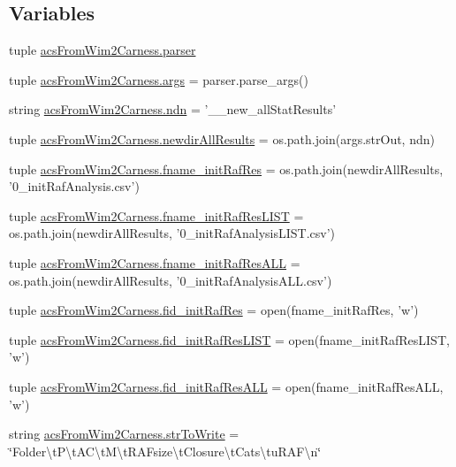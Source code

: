 \subsection*{Variables}
\begin{DoxyCompactItemize}
\item 
tuple \hyperlink{a00094_aed93287ef2c9a4a9ba68f8ffc75aae17}{acs\-From\-Wim2\-Carness.\-parser}
\item 
tuple \hyperlink{a00094_ac4c461267ee7f11bbe525de64f56cd10}{acs\-From\-Wim2\-Carness.\-args} = parser.\-parse\-\_\-args()
\item 
string \hyperlink{a00094_a6f995419ddd7f2de58506d9541238dbc}{acs\-From\-Wim2\-Carness.\-ndn} = '\-\_\-\_\-new\-\_\-all\-Stat\-Results'
\item 
tuple \hyperlink{a00094_a4af2fb5abbd4a6e8930401e66af5b79d}{acs\-From\-Wim2\-Carness.\-newdir\-All\-Results} = os.\-path.\-join(args.\-str\-Out, ndn)
\item 
tuple \hyperlink{a00094_a6df9226d812c675c76a936c215c07e53}{acs\-From\-Wim2\-Carness.\-fname\-\_\-init\-Raf\-Res} = os.\-path.\-join(newdir\-All\-Results, '0\-\_\-init\-Raf\-Analysis.\-csv')
\item 
tuple \hyperlink{a00094_a69f06c42408f8a1ae74e34daa83402b7}{acs\-From\-Wim2\-Carness.\-fname\-\_\-init\-Raf\-Res\-L\-I\-S\-T} = os.\-path.\-join(newdir\-All\-Results, '0\-\_\-init\-Raf\-Analysis\-L\-I\-S\-T.\-csv')
\item 
tuple \hyperlink{a00094_a89c98e628d7938077b4ed18215d4fd9b}{acs\-From\-Wim2\-Carness.\-fname\-\_\-init\-Raf\-Res\-A\-L\-L} = os.\-path.\-join(newdir\-All\-Results, '0\-\_\-init\-Raf\-Analysis\-A\-L\-L.\-csv')
\item 
tuple \hyperlink{a00094_a2f9cfe05abfed3ab6326d0cb094c7c80}{acs\-From\-Wim2\-Carness.\-fid\-\_\-init\-Raf\-Res} = open(fname\-\_\-init\-Raf\-Res, 'w')
\item 
tuple \hyperlink{a00094_a7af2668de12720f3c7925527002d81b0}{acs\-From\-Wim2\-Carness.\-fid\-\_\-init\-Raf\-Res\-L\-I\-S\-T} = open(fname\-\_\-init\-Raf\-Res\-L\-I\-S\-T, 'w')
\item 
tuple \hyperlink{a00094_add1c3bb75f1d98889c27099fc14fc6a8}{acs\-From\-Wim2\-Carness.\-fid\-\_\-init\-Raf\-Res\-A\-L\-L} = open(fname\-\_\-init\-Raf\-Res\-A\-L\-L, 'w')
\item 
string \hyperlink{a00094_a34b3667c3c217a35a0e9b71458d2b233}{acs\-From\-Wim2\-Carness.\-str\-To\-Write} = \char`\"{}Folder\textbackslash{}t\-P\textbackslash{}t\-A\-C\textbackslash{}t\-M\textbackslash{}t\-R\-A\-Fsize\textbackslash{}t\-Closure\textbackslash{}t\-Cats\textbackslash{}tu\-R\-A\-F\textbackslash{}n\char`\"{}

\end{DoxyCompactItemize}
